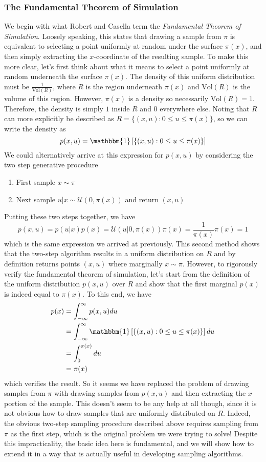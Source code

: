 \documentclass[12pt]{article}
\begin{document}
 \subsubsection{The Fundamental Theorem of Simulation}
 We begin with what Robert and Casella term the \textit{Fundamental Theorem of Simulation}. Loosely speaking, this states that drawing a sample from $\pi$ is equivalent to selecting a point
 uniformly at random under the surface $\pi(x)$, and then simply extracting the $x$-coordinate of the resulting sample. To make this more clear, let's first think about what it means to select a point
 uniformly at random underneath the surface $\pi(x)$. The density of this uniform distribution must be $\frac{1}{\text{Vol}(R)}$, where $R$ is the region underneath $\pi(x)$ and $\text{Vol}(R)$ is the 
 volume of this region. However, $\pi(x)$ is a density so necessarily $\text{Vol}(R) = 1$. Therefore, the density is simply $1$ inside $R$ and $0$ everywhere else. Noting that $R$ can more explicitly 
 be described as $R = \{(x, u): 0 \leq u \leq \pi(x)\}$, so we can write the density as 
 \[p(x, u) = \mathbbm{1}\left[\{(x, u): 0 \leq u \leq \pi(x)\} \right]\]
We could alternatively arrive at this expression for $p(x, u)$ by considering the two step generative procedure
\begin{enumerate}
\item First sample $x \sim \pi$
\item Next sample $u|x \sim \mathcal{U}(0, \pi(x))$ and return $(x, u)$
\end{enumerate}
Putting these two steps together, we have 
\[p(x, u) = p(u|x)p(x) = \mathcal{U}(u|0, \pi(x))\pi(x) = \frac{1}{\pi(x)}\pi(x) = 1\]
which is the same expression we arrived at previously. This second method shows that the two-step algorithm results in a uniform distribution on $R$ and by definition returns
points $(x, u)$ where marginally $x \sim \pi$. However, to rigorously verify the fundamental theorem of simulation, let's start from the definition of the uniform distribution $p(x, u)$ 
over $R$ and show that the first marginal $p(x)$ is indeed equal to $\pi(x)$. To this end, we have
\begin{align*}
p(x) &= \int_{-\infty}^{\infty} p(x, u) du \\
       &= \int_{-\infty}^{\infty} \mathbbm{1}\left[\{(x, u): 0 \leq u \leq \pi(x)\} \right] du \\
       &= \int_{0}^{\pi(x)} du \\
       &= \pi(x)
\end{align*}
which verifies the result. So it seems we have replaced the problem of drawing samples from $\pi$ with drawing samples from $p(x, u)$ and then extracting the $x$ portion of the sample. 
This doesn't seem to be any help at all though, since it is not obvious how to draw samples that are uniformly distributed on $R$. Indeed, the obvious two-step sampling procedure described 
above requires sampling from $\pi$ as the first step, which is the original problem we were trying to solve! Despite this impracticality, the basic idea here is fundamental, and we will show how 
to extend it in a way that is actually useful in developing sampling algorithms. 
\end{document}
